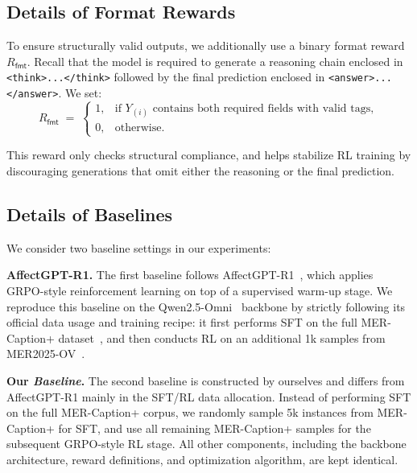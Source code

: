 \documentclass{article}
\theoremstyle{plain}
\theoremstyle{definition}
\theoremstyle{remark}
\begin{document}
\subsection{Details of Format Rewards}
\label{sec:format-reward}

To ensure structurally valid outputs, we additionally use a binary format reward $R_{\mathsf{fmt}}$.
Recall that the model is required to generate a reasoning chain enclosed in \texttt{<think>...</think>} followed by the final prediction enclosed in \texttt{<answer>...</answer>}.
We set:
\begin{equation}
R_{\mathsf{fmt}} \;=\;
\begin{cases}
1, & \text{if } Y_{(i)} \text{ contains both required fields with valid tags},\\
0, & \text{otherwise}.
\end{cases}
\end{equation}

This reward only checks structural compliance, and helps stabilize RL training by discouraging generations that omit either the reasoning or the final prediction.


\subsection{Details of Baselines}
\label{sec:task-baseline}

We consider two baseline settings in our experiments:

\noindent\textbf{AffectGPT-R1.}
The first baseline follows AffectGPT-R1~\cite{lian2025affectgptr1}, which applies GRPO-style reinforcement learning on top of a supervised warm-up stage.
We reproduce this baseline on the Qwen2.5-Omni~\cite{xu2025qwen2} backbone by strictly following its official data usage and training recipe: it first performs SFT on the full MER-Caption+ dataset~\cite{lian2025affectgpt}, and then conducts RL on an additional 1k samples from MER2025-OV~\cite{lian2025mer}.


\noindent\textbf{Our \emph{Baseline}.}
The second baseline is constructed by ourselves and differs from AffectGPT-R1 mainly in the SFT/RL data allocation.
Instead of performing SFT on the full MER-Caption+ corpus, we randomly sample 5k instances from MER-Caption+ for SFT, and use all remaining MER-Caption+ samples for the subsequent GRPO-style RL stage.
All other components, including the backbone architecture, reward definitions, and optimization algorithm, are kept identical.
\end{document}
